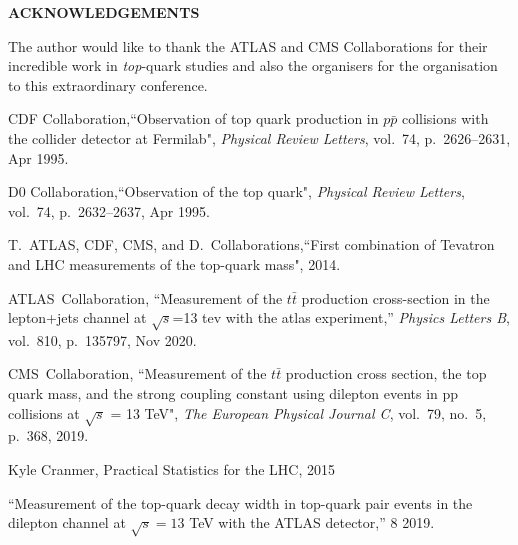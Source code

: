 \documentclass[12pt]{article}
\def\Acknowledgements{\bigskip  \bigskip \begin{center} \begin{large}
             \bf ACKNOWLEDGEMENTS \end{large}\end{center}}
\begin{document}

\Acknowledgements
The author would like to thank the ATLAS and CMS Collaborations for their incredible work in \emph{top}-quark studies and also the organisers for the organisation to this extraordinary conference.


\begin{thebibliography}{99}



CDF Collaboration,``Observation of top quark production in $p\bar{p}$ collisions with the collider detector at Fermilab", {\em Physical Review Letters}, vol.~74, p.~2626–2631, Apr 1995.

D0 Collaboration,``Observation of the top quark", {\em Physical Review Letters}, vol.~74, p.~2632–2637, Apr 1995.

T.~ATLAS, CDF, CMS, and D.~Collaborations,``First combination of Tevatron and LHC measurements of the top-quark mass", 2014.

ATLAS~Collaboration, ``Measurement of the $t\bar{t}$ production cross-section in the lepton+jets channel at $\sqrt{s}$=13 tev with the atlas experiment,''
  {\em Physics Letters B}, vol.~810, p.~135797, Nov 2020.

CMS~Collaboration, ``Measurement of the $t\bar{t}$ production cross section, the top quark mass, and the strong coupling constant using dilepton events in pp collisions
  at $\sqrt{s}$ = 13 TeV", {\em The European
  Physical Journal C}, vol.~79, no.~5, p.~368, 2019.

Kyle Cranmer, Practical Statistics for the LHC, 2015

``{Measurement of the top-quark decay width in top-quark pair events in the
  dilepton channel at $\sqrt{s}=13$ TeV with the ATLAS detector},'' 8 2019.


\end{thebibliography}

 
\end{document}
